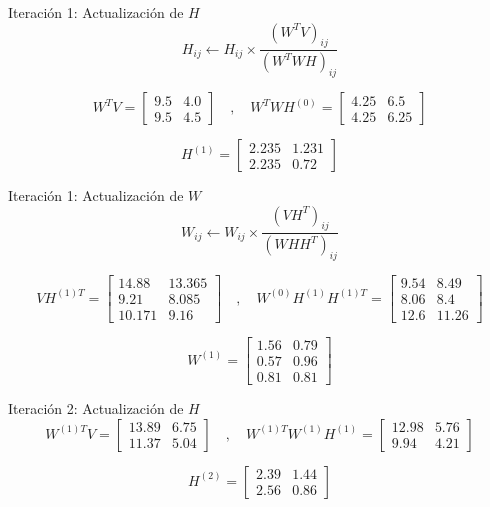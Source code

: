 \documentclass{beamer}
\begin{document}
\begin{frame}{Iteración 1: Actualización de \( H \)}
\[
H_{ij} \leftarrow H_{ij} \times \frac{(W^T V)_{ij}}{(W^T W H)_{ij}}
\]

\[
W^T V = \begin{bmatrix}
9.5 & 4.0 \\
9.5 & 4.5
\end{bmatrix}
\quad , \quad
W^T W H^{(0)} = \begin{bmatrix}
4.25 & 6.5 \\
4.25 & 6.25
\end{bmatrix}
\]

\[
H^{(1)} = \begin{bmatrix}
2.235 & 1.231 \\
2.235 & 0.72
\end{bmatrix}
\]
\end{frame}

\begin{frame}{Iteración 1: Actualización de \( W \)}
\[
W_{ij} \leftarrow W_{ij} \times \frac{(V H^T)_{ij}}{(W H H^T)_{ij}}
\]

\[
V H^{(1)T} = \begin{bmatrix}
14.88 & 13.365 \\
9.21 & 8.085 \\
10.171 & 9.16
\end{bmatrix}
\quad , \quad
W^{(0)} H^{(1)} H^{(1)T} = \begin{bmatrix}
9.54 & 8.49 \\
8.06 & 8.4 \\
12.6 & 11.26
\end{bmatrix}
\]

\[
W^{(1)} = \begin{bmatrix}
1.56 & 0.79 \\
0.57 & 0.96 \\
0.81 & 0.81
\end{bmatrix}
\]
\end{frame}

\begin{frame}{Iteración 2: Actualización de \( H \)}
\[
W^{(1)T} V = \begin{bmatrix}
13.89 & 6.75 \\
11.37 & 5.04
\end{bmatrix}
\quad , \quad
W^{(1)T} W^{(1)} H^{(1)} = \begin{bmatrix}
12.98 & 5.76 \\
9.94 & 4.21
\end{bmatrix}
\]

\[
H^{(2)} = \begin{bmatrix}
2.39 & 1.44 \\
2.56 & 0.86
\end{bmatrix}
\]
\end{frame}
\end{document}
